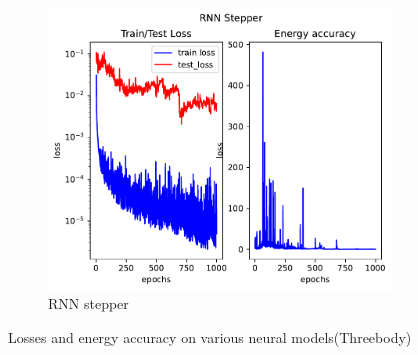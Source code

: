 \begin{figure}[H]
\begin{subfigure}[b]{0.3\textwidth}
		\includegraphics[width=\textwidth]{chapters/chapter5/body3_rne_loss.pdf}
		\caption{RNN stepper}
	\end{subfigure}
	
	\caption{Losses and energy accuracy on various neural models(Threebody)}
	\label{body3_loss}
\end{figure}

